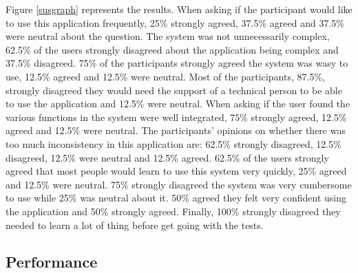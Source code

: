Figure \ref{susgraph} represents the results. When asking if the participant would like to use this application frequently, 25\% strongly agreed, 37.5\% agreed and 37.5\% were neutral about the question. The system was not unnecessarily complex, 62.5\% of the users strongly disagreed about the application being complex and 37.5\% disagreed. 75\% of the participants strongly agreed the system was wasy to use, 12.5\% agreed and 12.5\% were neutral. Most of the participants, 87.5\%, strongly disagreed they would need the support of a technical person to be able to use the application and 12.5\% were neutral. When asking if the user found the various functions in the system were well integrated, 75\% strongly agreed, 12.5\% agreed and 12.5\% were neutral. The participants' opinions on whether there was too much inconsistency in this application are: 62.5\% strongly disagreed, 12.5\% disagreed, 12.5\% were neutral and 12.5\% agreed. 62.5\% of the users strongly agreed that most people would learn to use this system very quickly, 25\% agreed and 12.5\% were neutral. 75\% strongly disagreed the system was very cumbersome to use while 25\% was neutral about it. 50\% agreed they felt very confident using the application and 50\% strongly agreed. Finally, 100\% strongly disagreed they needed to learn a lot of thing before get going with the tests.

\subsection{Performance}



